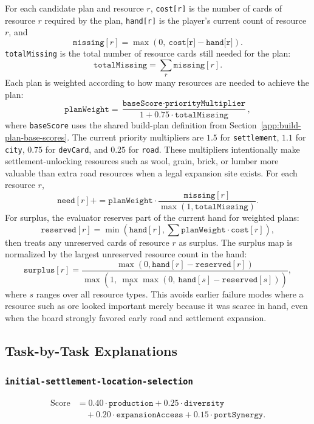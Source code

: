 \documentclass{article}
\begin{document}
For each candidate plan and resource $r$, \texttt{cost[r]} is the number of cards of resource $r$ required by the plan, \texttt{hand[r]} is the player's current count of resource $r$, and
\[
\texttt{missing}[r] = \max(0,\ \texttt{cost[r]} - \texttt{hand[r]}).
\]
\texttt{totalMissing} is the total number of resource cards still needed for the plan:
\[
\texttt{totalMissing} = \sum_r \texttt{missing}[r].
\]
Each plan is weighted according to how many resources are needed to achieve the plan:
\[
\texttt{planWeight} = \frac{\texttt{baseScore} \cdot \texttt{priorityMultiplier}}{1 + 0.75 \cdot \texttt{totalMissing}},
\]
where \texttt{baseScore} uses the shared build-plan definition from Section~\ref{app:build-plan-base-scores}. The current priority multipliers are $1.5$ for \texttt{settlement}, $1.1$ for \texttt{city}, $0.75$ for \texttt{devCard}, and $0.25$ for \texttt{road}. These multipliers intentionally make settlement-unlocking resources such as wool, grain, brick, or lumber more valuable than extra road resources when a legal expansion site exists.
For each resource $r$,
\[
\texttt{need}[r] {+}{=} \texttt{planWeight} \cdot \frac{\texttt{missing}[r]}{\max(1,\texttt{totalMissing})}.
\]
For surplus, the evaluator reserves part of the current hand for weighted plans:
\[
\texttt{reserved}[r] = \min(\texttt{hand}[r], \sum \texttt{planWeight} \cdot \texttt{cost}[r]),
\]
then treats any unreserved cards of resource $r$ as surplus. The surplus map is normalized by the largest unreserved resource count in the hand:
\[
\texttt{surplus}[r] =
\frac{\max(0, \texttt{hand}[r] - \texttt{reserved}[r])}
{\max(1,\ \max_s \max(0,\ \texttt{hand}[s] - \texttt{reserved}[s]))},
\]
where $s$ ranges over all resource types. This avoids earlier failure modes where a resource such as ore looked important merely because it was scarce in hand, even when the board strongly favored early road and settlement expansion.

\subsection{Task-by-Task Explanations}

\subsubsection{\texttt{initial-settlement-location-selection}}
\label{app:task-initial-settlement-location-selection}
\[
\begin{aligned}
\text{Score} &=
0.40 \cdot \texttt{production}
+ 0.25 \cdot \texttt{diversity} \\
&\quad + 0.20 \cdot \texttt{expansionAccess}
+ 0.15 \cdot \texttt{portSynergy}.
\end{aligned}
\]
\end{document}
